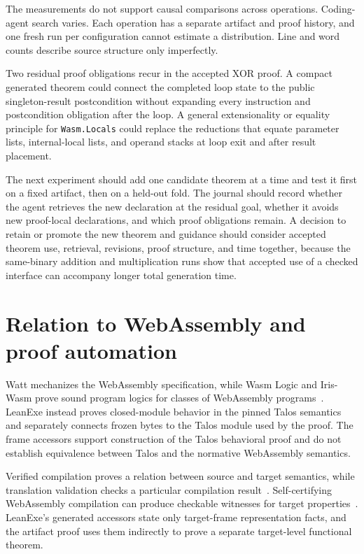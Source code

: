\documentclass[10pt]{article}
\newcommand{\code}[1]{\texttt{#1}}
\begin{document}
The measurements do not support causal comparisons across operations.  Coding-agent search varies.  Each operation has a separate artifact and proof history, and one fresh run per configuration cannot estimate a distribution.  Line and word counts describe source structure only imperfectly.

Two residual proof obligations recur in the accepted XOR proof.  A compact generated theorem could connect the completed loop state to the public singleton-result postcondition without expanding every instruction and postcondition obligation after the loop.  A general extensionality or equality principle for \code{Wasm.Locals} could replace the reductions that equate parameter lists, internal-local lists, and operand stacks at loop exit and after result placement.

The next experiment should add one candidate theorem at a time and test it first on a fixed artifact, then on a held-out fold.  The journal should record whether the agent retrieves the new declaration at the residual goal, whether it avoids new proof-local declarations, and which proof obligations remain.  A decision to retain or promote the new theorem and guidance should consider accepted theorem use, retrieval, revisions, proof structure, and time together, because the same-binary addition and multiplication runs show that accepted use of a checked interface can accompany longer total generation time.

\section{Relation to WebAssembly and proof automation}

Watt mechanizes the WebAssembly specification, while Wasm Logic and Iris-Wasm prove sound program logics for classes of WebAssembly programs~\cite{Watt2018Mechanising,Watt2019WasmLogic,Rao2023IrisWasm}.  LeanExe instead proves closed-module behavior in the pinned Talos semantics and separately connects frozen bytes to the Talos module used by the proof.  The frame accessors support construction of the Talos behavioral proof and do not establish equivalence between Talos and the normative WebAssembly semantics.

Verified compilation proves a relation between source and target semantics, while translation validation checks a particular compilation result~\cite{Leroy2009CompCert,Pnueli1998TranslationValidation}.  Self-certifying WebAssembly compilation can produce checkable witnesses for target properties~\cite{Namjoshi2021SelfCertifying}.  LeanExe's generated accessors state only target-frame representation facts, and the artifact proof uses them indirectly to prove a separate target-level functional theorem.
\end{document}
